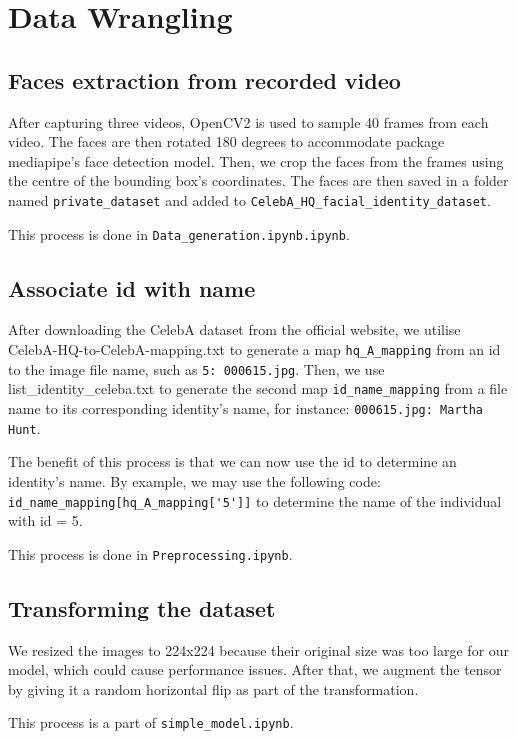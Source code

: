 \section{Data Wrangling}


\subsection{Faces extraction from recorded video}

After capturing three videos, OpenCV2 is used to sample 40 frames from each video. The faces are then rotated 180 degrees to accommodate package mediapipe's face detection model. Then, we crop the faces from the frames using the centre of the bounding box's coordinates. The faces are then saved in a folder named \verb|private_dataset| and added to \verb|CelebA_HQ_facial_identity_dataset|.

This process is done in \verb|Data_generation.ipynb.ipynb|.


\subsection{Associate id with name}

After downloading the CelebA dataset from the official website, we utilise CelebA-HQ-to-CelebA-mapping.txt to generate a map \verb|hq_A_mapping| from an id to the image file name, such as \verb|5: 000615.jpg|.
Then, we use list\_identity\_celeba.txt to generate the second map \verb|id_name_mapping| from a file name to its corresponding identity's name, for instance: \verb|000615.jpg: Martha Hunt|.

The benefit of this process is that we can now use the id to determine an identity's name. By example, we may use the following code: \verb|id_name_mapping[hq_A_mapping['5']]| to determine the name of the individual with id = 5.

This process is done in \verb|Preprocessing.ipynb|.

\subsection{Transforming the dataset}

We resized the images to 224x224 because their original size was too large for our model, which could cause performance issues. After that, we augment the tensor by giving it a random horizontal flip as part of the transformation.

This process is a part of \verb|simple_model.ipynb|.
